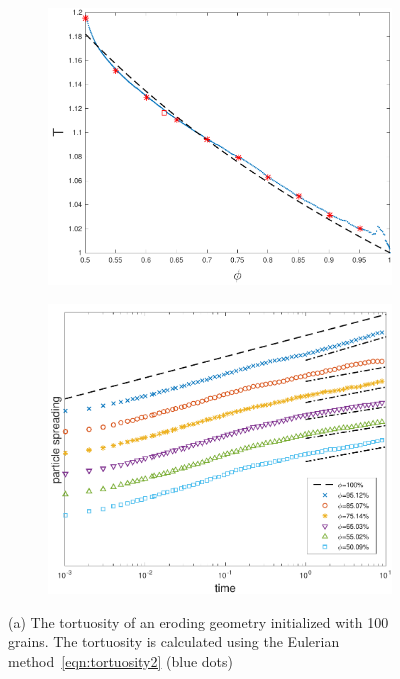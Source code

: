 \documentclass[preprint,10pt]{elsarticle}
\begin{document}
\begin{figure}[H]
\begin{subfigure}[b]{0.5\textwidth}
\includegraphics*[height = 0.8\linewidth]{./figs/tort_eulerian100}
\caption{}
\end{subfigure}
\begin{subfigure}[b]{0.5\textwidth}
\includegraphics*[height=0.8\linewidth]{./figs/100b_second_moment_long_ref}
\caption{}
\end{subfigure}
\caption{\label{fig:Eroding100Transport} (a) The tortuosity of an
eroding geometry initialized with 100 grains.  The tortuosity is
calculated using the Eulerian method~\eqref{eqn:tortuosity2} (blue dots)
}
\end{figure}
\end{document}

